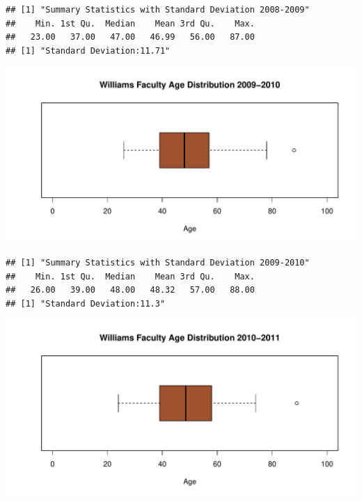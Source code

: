 \documentclass[12pt,a4paper]{article}\usepackage[]{graphicx}\usepackage[]{color}
\makeatletter
\def\maxwidth{ %
  \ifdim\Gin@nat@width>\linewidth
    \linewidth
  \else
    \Gin@nat@width
  \fi
}
\newenvironment{kframe}{%
 \def\at@end@of@kframe{}%
 \ifinner\ifhmode%
  \def\at@end@of@kframe{\end{minipage}}%
  \begin{minipage}{\columnwidth}%
 \fi\fi%
 \def\FrameCommand##1{\hskip\@totalleftmargin \hskip-\fboxsep
 \colorbox{shadecolor}{##1}\hskip-\fboxsep
     \hskip-\linewidth \hskip-\@totalleftmargin \hskip\columnwidth}%
 \MakeFramed {\advance\hsize-\width
   \@totalleftmargin\z@ \linewidth\hsize
   \@setminipage}}%
 {\par\unskip\endMakeFramed%
 \at@end@of@kframe}
\newenvironment{knitrout}{}{} %
\theoremstyle{definition}
\makeatother
\begin{document}
\begin{knitrout}
\color{fgcolor}\begin{kframe}
\begin{verbatim}
## [1] "Summary Statistics with Standard Deviation 2008-2009"
##    Min. 1st Qu.  Median    Mean 3rd Qu.    Max. 
##   23.00   37.00   47.00   46.99   56.00   87.00
## [1] "Standard Deviation:11.71"
\end{verbatim}
\end{kframe}
\end{knitrout}

\begin{knitrout}
\color{fgcolor}
\includegraphics[width=\maxwidth]{figure/unnamed-chunk-24-1} 

\end{knitrout}

\begin{knitrout}
\color{fgcolor}\begin{kframe}
\begin{verbatim}
## [1] "Summary Statistics with Standard Deviation 2009-2010"
##    Min. 1st Qu.  Median    Mean 3rd Qu.    Max. 
##   26.00   39.00   48.00   48.32   57.00   88.00
## [1] "Standard Deviation:11.3"
\end{verbatim}
\end{kframe}
\end{knitrout}


\begin{knitrout}
\color{fgcolor}
\includegraphics[width=\maxwidth]{figure/unnamed-chunk-26-1} 

\end{knitrout}
\end{document}
